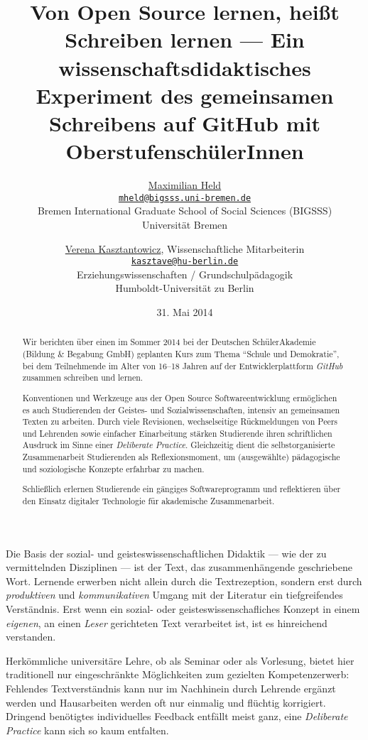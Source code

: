 \documentclass
	[
		11pt,
		a4paper,
		oneside,
		german
	]
	{article}
\title{
	Von Open Source lernen, heißt Schreiben lernen ---
	Ein wissenschaftsdidaktisches Experiment des gemeinsamen Schreibens auf GitHub mit OberstufenschülerInnen
}
\date{31. Mai 2014}
\author{
	\href{http://www.maxheld.de}{Maximilian Held}\\
	\href{mailto:mheld@bigsss.uni-bremen.de}{\texttt{mheld@bigsss.uni-bremen.de}}\\
	Bremen International Graduate School of Social Sciences (BIGSSS)\\
	Universität Bremen
	\and
	\href{https://www.erziehungswissenschaften.hu-berlin.de/grundschulpaed/mitarbeiterinnen/lb-deutsch/v.-kasztantowicz}{Verena Kasztantowicz}, Wissenschaftliche Mitarbeiterin\\
	\href{mailto:kasztave@hu-berlin.de}{\texttt{kasztave@hu-berlin.de}}\\
	Erziehungswissenschaften / Grundschulpädagogik \\
	Humboldt-Universität zu Berlin
}
\begin{document}
\maketitle

\begin{abstract}
	Wir berichten über einen im Sommer 2014 bei der Deutschen SchülerAkademie (Bildung \& Begabung GmbH) geplanten Kurs zum Thema ``Schule und Demokratie'', bei dem Teilnehmende im Alter von 16--18 Jahren auf der Entwicklerplattform \emph{GitHub} zusammen schreiben und lernen.

	Konventionen und Werkzeuge aus der Open Source Softwareentwicklung ermöglichen es auch Studierenden der Geistes- und Sozialwissenschaften, intensiv an gemeinsamen Texten zu arbeiten.
	Durch viele Revisionen, wechselseitige Rückmeldungen von Peers und Lehrenden sowie einfacher Einarbeitung stärken Studierende ihren schriftlichen Ausdruck im Sinne einer \emph{Deliberate Practice}.
	Gleichzeitig dient die selbstorganisierte Zusammenarbeit Studierenden als Reflexionsmoment, um (ausgewählte) pädagogische und soziologische Konzepte erfahrbar zu machen.

	Schließlich erlernen Studierende ein gängiges Softwareprogramm und reflektieren über den Einsatz digitaler Technologie für akademische Zusammenarbeit.
\end{abstract}

Die Basis der sozial- und geisteswissenschaftlichen Didaktik --- wie der zu vermittelnden Disziplinen --- ist der Text, das zusammenhängende geschriebene Wort.
Lernende erwerben nicht allein durch die Textrezeption, sondern erst durch \emph{produktiven} und \emph{kommunikativen} Umgang mit der Literatur ein tiefgreifendes Verständnis.
Erst wenn ein sozial- oder geisteswissenschafliches Konzept in einem \emph{eigenen}, an einen \emph{Leser} gerichteten Text verarbeitet ist, ist es hinreichend verstanden.

Herkömmliche universitäre Lehre, ob als Seminar oder als Vorlesung, bietet hier traditionell nur eingeschränkte Möglichkeiten zum gezielten Kompetenzerwerb: Fehlendes Textverständnis kann nur im Nachhinein durch Lehrende ergänzt werden und Hausarbeiten werden oft nur einmalig und flüchtig korrigiert.
Dringend benötigtes individuelles Feedback entfällt meist ganz, eine \emph{Deliberate Practice} \parencite{Ericsson2007} kann sich so kaum entfalten.
\end{document}
